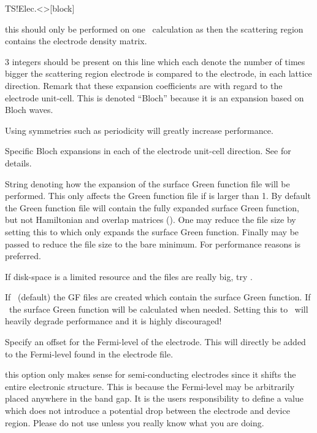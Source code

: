 \begin{fdfentry}{TS!Elec.<>}[block]
\begin{fdfoptions}
    \note this should only be performed on one \tsiesta\ calculation
    as then the scattering region  contains the
    electrode density matrix.

    \option[Bloch]%
    $3$ integers should be present on this line which each denote the
    number of times bigger the scattering region electrode is compared
    to the electrode, in each lattice direction. Remark that these
    expansion coefficients are with regard to the electrode unit-cell.
    This is denoted ``Bloch'' because it is an expansion based on
    Bloch waves.

    \note Using symmetries such as periodicity will greatly increase
    performance.

    \option[Bloch-A/a1|B/a2|C/a3]%
    Specific Bloch expansions in each of the electrode unit-cell
    direction. See  for details.

    String denoting how the expansion of the surface Green function
    file will be performed. This only affects the Green function file
    if  is larger than 1. By default the Green function
    file will contain the fully expanded surface Green function, but
    not Hamiltonian and overlap matrices (). One may
    reduce the file size by setting this to  which only
    expands the surface Green function. Finally  may be
    passed to reduce the file size to the bare minimum.
    For performance reasons  is preferred.

    If disk-space is a limited resource and the  files
    are really big, try .

    If \fdftrue\ (default) the GF files are created which contain
    the surface Green function.
    If \fdffalse\ the surface Green function will be calculated when
    needed. 
    Setting this to \fdffalse\ will heavily degrade performance and
    it is highly discouraged!

    \option[delta-Ef]%
    Specify an offset for the Fermi-level of the electrode. This will
    directly be added to the Fermi-level found in the electrode file.
    
    \note this option only makes sense for semi-conducting electrodes
    since it shifts the entire electronic structure. This is because
    the Fermi-level may be arbitrarily placed anywhere in the band
    gap. It is the users responsibility to define a value which does
    not introduce a potential drop between the electrode and device
    region. Please do not use unless you really know what you are
    doing.


\end{fdfoptions}
\end{fdfentry}
